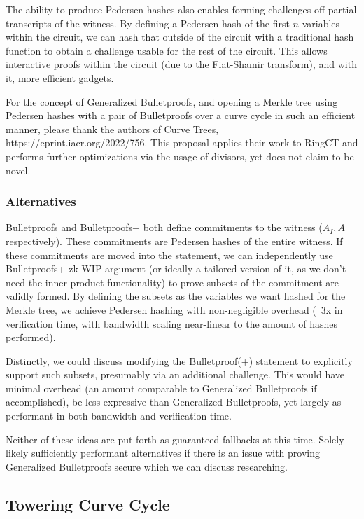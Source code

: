 \documentclass[]{article}
\begin{document}
The ability to produce Pedersen hashes also enables forming challenges off partial transcripts of the witness. By defining a Pedersen hash of the first $n$ variables within the circuit, we can hash that outside of the circuit with a traditional hash function to obtain a challenge usable for the rest of the circuit. This allows interactive proofs within the circuit (due to the Fiat-Shamir transform), and with it, more efficient gadgets.

For the concept of Generalized Bulletproofs, and opening a Merkle tree using Pedersen hashes with a pair of Bulletproofs over a curve cycle in such an efficient manner, please thank the authors of Curve Trees, https://eprint.iacr.org/2022/756. This proposal applies their work to RingCT and performs further optimizations via the usage of divisors, yet does not claim to be novel.

\subsubsection{Alternatives}

Bulletproofs and Bulletproofs+ both define commitments to the witness ($A_I, A$ respectively). These commitments are Pedersen hashes of the entire witness. If these commitments are moved into the statement, we can independently use Bulletproofs+ zk-WIP argument (or ideally a tailored version of it, as we don't need the inner-product functionality) to prove subsets of the commitment are validly formed. By defining the subsets as the variables we want hashed for the Merkle tree, we achieve Pedersen hashing with non-negligible overhead (~3x in verification time, with bandwidth scaling near-linear to the amount of hashes performed).

Distinctly, we could discuss modifying the Bulletproof(+) statement to explicitly support such subsets, presumably via an additional challenge. This would have minimal overhead (an amount comparable to Generalized Bulletproofs if accomplished), be less expressive than Generalized Bulletproofs, yet largely as performant in both bandwidth and verification time.

Neither of these ideas are put forth as guaranteed fallbacks at this time. Solely likely sufficiently performant alternatives if there is an issue with proving Generalized Bulletproofs secure which we can discuss researching.

\subsection{Towering Curve Cycle}
\end{document}
